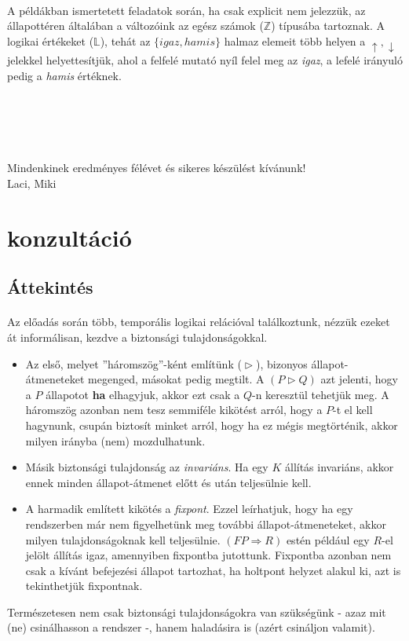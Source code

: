 \documentclass[12pt]{article}
\begin{document}
	\paragraph{}
	A példákban ismertetett feladatok során, ha csak explicit nem jelezzük, az állapottéren általában a változóink az egész számok ($\mathbb{Z}$) típusába tartoznak. A logikai értékeket ($\mathbb{L}$), tehát az $\{igaz, hamis\}$ halmaz elemeit több helyen a $\uparrow, \downarrow$ jelekkel helyettesítjük, ahol a felfelé mutató nyíl felel meg az \textit{igaz}, a lefelé irányuló pedig a \textit{hamis} értéknek.\\\\\\\\\\\\
	Mindenkinek eredményes félévet és sikeres készülést kívánunk!
	\\Laci, Miki
	
	\newpage
	\section{konzultáció}
	\subsection{Áttekintés}
	\paragraph{}
	Az előadás során több, temporális logikai relációval találkoztunk, nézzük ezeket át informálisan, kezdve a biztonsági tulajdonságokkal.
	
	\begin{itemize}
		\item 
		Az első, melyet ''háromszög''-ként említünk ($ \vartriangleright $), bizonyos állapot-átmeneteket megenged, másokat pedig megtilt. A $(P \vartriangleright Q)$ azt jelenti, hogy a $P$ állapotot \textbf{ha} elhagyjuk, akkor ezt csak a $Q$-n keresztül tehetjük meg. A háromszög azonban nem tesz semmiféle kikötést arról, hogy a $P$-t el kell hagynunk, csupán biztosít minket arról, hogy ha ez mégis megtörténik, akkor milyen irányba (nem) mozdulhatunk.
		
		\item Másik biztonsági tulajdonság az \textit{invariáns}. Ha egy $K$ állítás invariáns, akkor ennek minden állapot-átmenet előtt és után teljesülnie kell.
		
		\item A harmadik említett kikötés a \textit{fixpont}. Ezzel leírhatjuk, hogy ha egy rendszerben már nem figyelhetünk meg további állapot-átmeneteket, akkor milyen tulajdonságoknak kell teljesülnie. $(FP \Rightarrow R)$ estén például egy $R$-el jelölt állítás igaz, amennyiben fixpontba jutottunk. Fixpontba azonban nem csak a kívánt befejezési állapot tartozhat, ha holtpont helyzet alakul ki, azt is tekinthetjük fixpontnak.
	\end{itemize}
	Természetesen nem csak biztonsági tulajdonságokra van szükségünk - azaz mit (ne) csinálhasson a rendszer -, hanem haladásira is (azért csináljon valamit).
	
\end{document}
